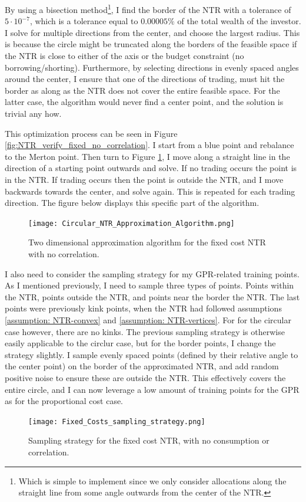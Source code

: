 \documentclass[11pt]{article}
\begin{document}
By using a bisection method\footnote{Which is simple to implement since we only consider allocations along the straight line from some angle outwards from the center of the NTR.},
I find the border of the \ac{NTR} with a tolerance of $5\cdot 10^{-7}$,
which is a tolerance equal to $0.00005\%$ of the total wealth of the investor. 
I solve for multiple directions from the center, and choose the largest radius. This is because the circle might be truncated along the borders of the feasible space
if the NTR is close to either of the axis or the budget constraint (no borrowing/shorting).
Furthermore, by selecting directions in evenly spaced angles around the center, I ensure that one of the directions of trading, must hit the border as along as the \ac{NTR} does not cover the entire feasible space.
For the latter case, the algorithm would never find a center point, and the solution is trivial any how.

This optimization process can be seen in Figure \ref{fig:NTR_verify_fixed_no_correlation}.
I start from a blue point and rebalance to the Merton point.
Then turn to Figure \ref{fig:FixedCost_NTR_Approximation}, I move along a straight line in the direction of a starting point outwards and solve.
If no trading occurs the point is in the \ac{NTR}. If trading occurs then the point is outside the \ac{NTR}, and I move backwards towards the center, and solve again.
This is repeated for each trading direction. The figure below displays this specific part of the algorithm.
\begin{figure}[!ht]
    \centering
    \texttt{[image: Circular\_NTR\_Approximation\_Algorithm.png]}
    \caption{Two dimensional approximation algorithm for the fixed cost NTR with no correlation.}
    \label{fig:FixedCost_NTR_Approximation}
\end{figure}
\FloatBarrier
I also need to consider the sampling strategy for my \ac{GPR}-related training points. As I mentioned previously, I need to sample three types of points.
Points within the \ac{NTR}, points outside the \ac{NTR}, and points near the border the \ac{NTR}. The last points were previously kink points,
when the NTR had followed assumptions \ref{assumption: NTR-convex} and \ref{assumption: NTR-vertices}.
For for the circular case however, there are no kinks.
The previous sampling strategy is otherwise easily applicable to the circlur case, but for the border points, I change the strategy slightly.
I sample evenly spaced points (defined by their relative angle to the center point) on the border of the approximated \ac{NTR}, and add random positive noise to ensure these are outside the NTR.
This effectively covers the entire circle, and I can now leverage a low amount of training points for the GPR as for the proportional cost case.
\begin{figure}[!ht]
    \centering
    \texttt{[image: Fixed\_Costs\_sampling\_strategy.png]}
    \caption{Sampling strategy for the fixed cost NTR, with no consumption or correlation.}
    \label{fig:Sample_Strategy_Fixed}
\end{figure}
\FloatBarrier
\end{document}
